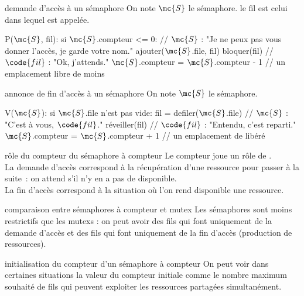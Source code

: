 \begin{adjustwidth}{-3cm}{-3cm}
\begin{implementation}{demande d'accès à un sémaphore}
    On note $\mc{S}$ le sémaphore. le fil  est celui dans lequel  est appelée.
    \begin{lstLNat}
    P($\mc{S}$, fil):
        si $\mc{S}$.compteur <= 0: 
            // $\mc{S}$ : "Je ne peux pas vous donner l'accès, je garde votre nom."
            ajouter($\mc{S}$.file, fil)
            bloquer(fil) // $\code{fil}$ : "Ok, j'attends."
        $\mc{S}$.compteur = $\mc{S}$.compteur - 1 // un emplacement libre de moins
    \end{lstLNat}
\end{implementation}

\begin{implementation}{annonce de fin d'accès à un sémaphore}
    On note $\mc{S}$ le sémaphore.
    \begin{lstLNat}
    V($\mc{S}$):
        si $\mc{S}$.file n'est pas vide:
            fil = defiler($\mc{S}$.file) // $\mc{S}$ : "C'est à vous, $\code{fil}$."
            réveiller(fil) // $\code{fil}$ : "Entendu, c'est reparti."
        $\mc{S}$.compteur = $\mc{S}$.compteur + 1 // un emplacement de libéré
    \end{lstLNat}
\end{implementation}

\begin{remarque}{}{rôle du compteur du sémaphore à compteur}
    Le compteur joue un rôle de .\\
    La demande d'accès correspond à la récupération d'une ressource pour passer à la suite~: on attend s'il n'y en a pas de disponible.\\
    La fin d'accès correspond à la situation où l'on rend disponible une ressource.
\end{remarque}

\begin{remarque}{}{comparaison entre sémaphores à compteur et mutex}
    Les sémaphores sont moins restrictifs que les mutexs : on peut avoir des fils qui font uniquement de la demande d'accès et des fils qui font uniquement de la fin d'accès (production de ressources).
\end{remarque}

\begin{remarque}{}{initialisation du compteur d'un sémaphore à compteur}
    On peut voir dans certaines situations la valeur du compteur initiale comme le nombre maximum souhaité de fils qui peuvent exploiter les ressources partagées simultanément.
\end{remarque}


\end{adjustwidth}
